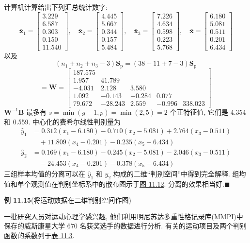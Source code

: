 
计算机计算给出下列汇总统计数字:
\[
\bar{\mathbf{x}}_1=\begin{bmatrix}3.229\\6.587\\0.303\\0.150\\11.540\end{bmatrix},\quad
\bar{\mathbf{x}}_2=\begin{bmatrix}4.445\\5.667\\0.344\\0.157\\5.484\end{bmatrix},\quad
\bar{\mathbf{x}}_3=\begin{bmatrix}7.226\\4.634\\0.598\\0.223\\5.768\end{bmatrix},\quad
\bar{\mathbf{x}}=\begin{bmatrix}6.180\\5.081\\0.511\\0.201\\6.434\end{bmatrix}
\]
以及
\[
(n_1+n_2+n_3-3)\mathbf{S}_{\mathrm{p}}=(38+11+7-3)\mathbf{S}_{\mathrm{p}}
\]
\[
=\mathbf{W}=\begin{bmatrix}
187.575&&&&\\
1.957&41.789&&&\\
-4.031&2.128&3.580&&\\
1.092&-0.143&-0.284&0.077&\\
79.672&-28.243&2.559&-0.996&338.023
\end{bmatrix}
\]
$\mathbf{W}^{-1}\mathbf{B}$ 最多有 $s=\min(g-1,p)=\min(2,5)=2$ 个正特征值, 它们是 4.354 和 0.559. 中心化的费希尔线性判别量为
\[
\begin{aligned}
\hat{y}_1&=0.312(x_1-6.180)-0.710(x_2-5.081)+2.764(x_3-0.511)\\
&\quad+11.809(x_4-0.201)-0.235(x_5-6.434)
\end{aligned}
\]
\[
\begin{aligned}
\hat{y}_2&=0.169(x_1-6.180)-0.245(x_2-5.081)-2.046(x_3-0.511)\\
&\quad-24.453(x_4-0.201)-0.378(x_5-6.434)
\end{aligned}
\]
三组样本均值的分离可以在 $\hat{y}_1$ 和 $\hat{y}_2$ 构成的二维“判别空间”中得到完全解释. 组均值和单个观测值在判别坐标系中的散布图示于\hyperref[fig:11.12]{图 11.12}. 分离的效果相当好.\hfill$\blacksquare$

\begin{mvfigure}
\label{fig:11.12}
\end{mvfigure}

\noindent\textbf{例 11.15}\quad (将运动数据在二维判别空间作图)

一批研究人员对运动心理学感兴趣, 他们利用明尼苏达多重性格记录库(MMPI)中保存的威斯康星大学 670 名获奖选手的数据进行分析. 有关的运动项目及两个判别函数的系数列于\hyperref[tab:11.3]{表 11.3}.
